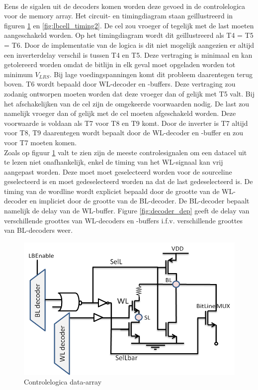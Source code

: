 \paragraph{}
Eens de sigalen uit de decoders komen worden deze gevoed in de controlelogica voor de memory array. Het circuit- en timingdiagram staan geïllustreerd in figuren \ref{fig:lbcell_timing1} en \ref{fig:lbcell_timing2}. De cel zou vroeger of tegelijk met de last moeten aangeschakeld worden. Op het timingdiagram wordt dit geïllustreerd als T4 = T5 = T6. Door de implementatie van de logica is dit niet mogelijk aangezien er altijd een inverterdelay verschil is tussen T4 en T5. Deze vertraging is minimaal en kan getolereerd worden omdat de bitlijn in elk geval moet opgeladen worden tot minimum $V_{LRS}$. Bij lage voedingspanningen komt dit probleem daarentegen terug boven. T6 wordt bepaald door WL-decoder en -buffers. Deze vertraging zou zodanig ontworpen moeten worden dat deze vroeger dan of gelijk met T5 valt. Bij het afschakelijken van de cel zijn de omgekeerde voorwaarden nodig. De last zou namelijk vroeger dan of gelijk met de cel moeten afgeschakeld worden. Deze voorwaarde is voldaan als T7 voor T8 en T9 komt. Door de inverter is T7 altijd voor T8, T9 daarentegen wordt bepaalt door de WL-decoder en -buffer en zou voor T7 moeten komen. \\
Zoals op figuur \ref{fig:lbcell_timing1} valt te zien zijn de meeste controlesignalen om een datacel uit te lezen niet onafhankelijk, enkel de timing van het WL-signaal kan vrij aangepast worden. Deze moet moet geselecteerd worden voor de sourceline geselecteerd is en moet gedeselecteerd worden na dat de last gedeselecteerd is. De timing van de wordline wordt expliciet bepaald door de grootte van de WL-decoder en impliciet door de grootte van de BL-decoder. De BL-decoder bepaalt namelijk de delay van de WL-buffer. Figure \ref{fig:decoder_dep} geeft de delay van verschillende groottes van WL-decoders en -buffers i.f.v. verschillende groottes van BL-decoders weer.

\begin{figure}[!ht]
  \centering
  \includegraphics[scale=0.6]{../fig/hfdstk-timing-lbcell1.png}
  \caption[Data-array:logica]{Controlelogica data-array}
  \label{fig:lbcell_timing1}
\end{figure}

